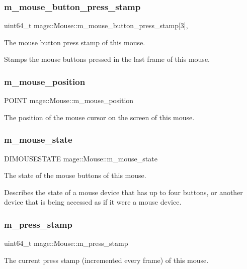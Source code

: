 \subsubsection{\texorpdfstring{m\+\_\+mouse\+\_\+button\+\_\+press\+\_\+stamp}{m\_mouse\_button\_press\_stamp}}
{\footnotesize\ttfamily uint64\+\_\+t mage\+::\+Mouse\+::m\+\_\+mouse\+\_\+button\+\_\+press\+\_\+stamp\mbox{[}3\mbox{]}\hspace{0.3cm}{\ttfamily [mutable]}, {\ttfamily [private]}}

The mouse button press stamp of this mouse.

Stamps the mouse buttons pressed in the last frame of this mouse. \hypertarget{classmage_1_1_mouse_a2a8332ef7a4daa0f9ed48a9a1ad80684}{}\label{classmage_1_1_mouse_a2a8332ef7a4daa0f9ed48a9a1ad80684} 
\subsubsection{\texorpdfstring{m\+\_\+mouse\+\_\+position}{m\_mouse\_position}}
{\footnotesize\ttfamily P\+O\+I\+NT mage\+::\+Mouse\+::m\+\_\+mouse\+\_\+position\hspace{0.3cm}{\ttfamily [private]}}

The position of the mouse cursor on the screen of this mouse. \hypertarget{classmage_1_1_mouse_af99645fb4226077abee4532a5e663066}{}\label{classmage_1_1_mouse_af99645fb4226077abee4532a5e663066} 
\subsubsection{\texorpdfstring{m\+\_\+mouse\+\_\+state}{m\_mouse\_state}}
{\footnotesize\ttfamily D\+I\+M\+O\+U\+S\+E\+S\+T\+A\+TE mage\+::\+Mouse\+::m\+\_\+mouse\+\_\+state\hspace{0.3cm}{\ttfamily [private]}}

The state of the mouse buttons of this mouse.

Describes the state of a mouse device that has up to four buttons, or another device that is being accessed as if it were a mouse device. \hypertarget{classmage_1_1_mouse_a32b30d3c37a2082869f4ff4f522dfbf8}{}\label{classmage_1_1_mouse_a32b30d3c37a2082869f4ff4f522dfbf8} 
\subsubsection{\texorpdfstring{m\+\_\+press\+\_\+stamp}{m\_press\_stamp}}
{\footnotesize\ttfamily uint64\+\_\+t mage\+::\+Mouse\+::m\+\_\+press\+\_\+stamp\hspace{0.3cm}{\ttfamily [private]}}

The current press stamp (incremented every frame) of this mouse. 
